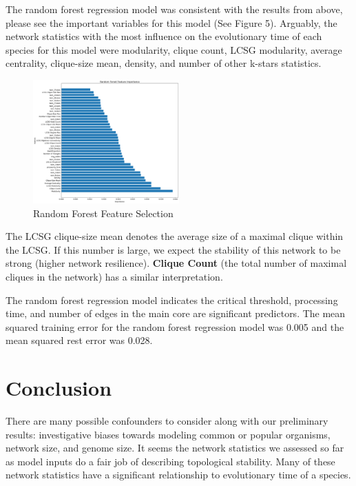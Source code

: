 \documentclass[12pt]{article}
\begin{document}
The random forest regression model was consistent with the results from above, please see the important variables for this model (See Figure 5). Arguably, the network statistics with the most influence on the evolutionary time of each species for this model were modularity, clique count, LCSG modularity, average centrality, clique-size mean, density, and number of other k-stars statistics.

\begin{figure}
  \vspace{-20pt}
  \begin{center}
    \includegraphics[width=0.5\textwidth]{PPIN_fig2}
  \end{center}
  \vspace{-20pt}
  \caption{Random Forest Feature Selection}
  \vspace{-10pt}
\end{figure}

The LCSG clique-size mean denotes the average size of a maximal clique within the LCSG. If this number is large, we expect the stability of this network to be strong (higher network resilience). \textbf{Clique Count} (the total number of maximal cliques in the network) has a similar interpretation.

The random forest regression model indicates the critical threshold, processing time, and number of edges in the main core are significant predictors. The mean squared training error for the random forest regression model was 0.005 and the mean squared rest error was 0.028.
\newline

\section{Conclusion}
There are many possible confounders to consider along with our preliminary results: investigative biases towards modeling common or popular organisms, network size, and genome size. It seems the network statistics we assessed so far as model inputs do a fair job of describing topological stability. Many of these network statistics have a significant relationship to evolutionary time of a species.
\end{document}
